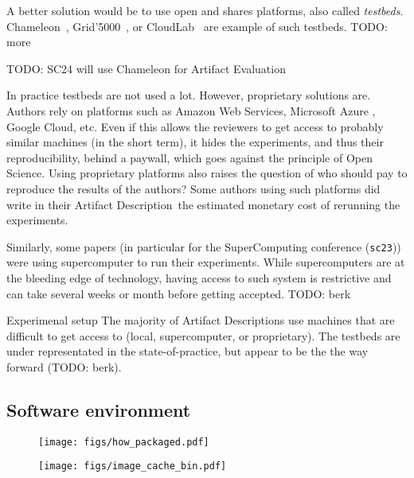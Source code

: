 \documentclass[sigconf]{acmart}
\newcommand{\ad}{Artifact Description}
\newcommand{\aeval}{Artifact Evaluation}
\newcommand{\todo}[1]{{\color{red}TODO: #1}}
\begin{document}
A better solution would be to use open and shares platforms, also called \emph{testbeds}.
Chameleon\ \cite{chameleon}, Grid'5000\ \cite{grid5000}, or CloudLab\ \cite{cloudlab} are example of such testbeds.
\todo{more \cite{nussbaum2017testbeds}}

\todo{SC24 will use Chameleon for \aeval}

In practice testbeds are not used a lot.
However, proprietary solutions are.
Authors rely on platforms such as Amazon Web Services, Microsoft Azure , Google Cloud, etc.
Even if this allows the reviewers to get access to probably similar machines (in the short term), it hides the experiments, and thus their reproducibility, behind a paywall, which goes against the principle of Open Science.
Using proprietary platforms also raises the question of who should pay to reproduce the results of the authors?
Some authors using such platforms did write in their \ad\ the estimated monetary cost of rerunning the experiments.

Similarly, some papers (in particular for the SuperComputing conference (\texttt{sc23})) were using supercomputer to run their experiments.
While supercomputers are at the bleeding edge of technology, having access to such system is restrictive and can take several weeks or month before getting accepted.
\todo{berk}

\begin{lesson}{Experimenal setup}{}
  The majority of \ad s use machines that are difficult to get access to (local, supercomputer, or proprietary). 
  The testbeds are under representated in the state-of-practice, but appear to be the the way forward \cite{nussbaum2017testbeds} (\todo{berk}).
\end{lesson}

\subsection{Software environment}\label{sec:sop:sw}

\begin{figure*}
  \centering
  \begin{subfigure}{0.49\textwidth}
    \centering
    \texttt{[image: figs/how\_packaged.pdf]}
  \caption{}\label{fig:techno}
  \end{subfigure}
  \begin{subfigure}{0.49\textwidth}
      \centering
      \texttt{[image: figs/image\_cache\_bin.pdf]}
    \caption{}\label{fig:cache_bin}
  \end{subfigure}
  \caption{\todo{}}\label{fig:techo_cache}
\end{figure*}
\end{document}
